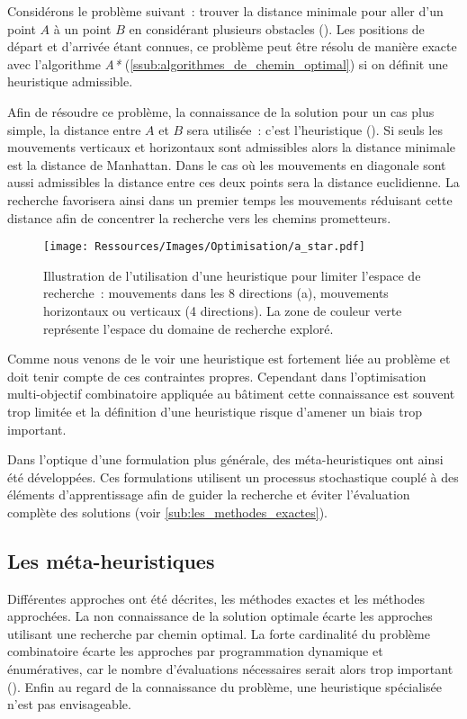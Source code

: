 Considérons le problème suivant~: trouver la distance minimale pour aller d’un point
$A$ à un point $B$ en considérant plusieurs obstacles ().
Les positions de départ et d’arrivée étant connues, ce problème peut être résolu
de manière exacte avec l’algorithme \textit{A*} (\ref{ssub:algorithmes_de_chemin_optimal})
si on définit une heuristique admissible.

Afin de résoudre ce problème, la connaissance de la solution pour un cas plus
simple, la distance entre $A$ et $B$ sera utilisée~: c’est l’heuristique
(). Si seuls les mouvements verticaux et horizontaux sont
admissibles alors la distance minimale est la distance de Manhattan. Dans le cas
où les mouvements en diagonale sont aussi admissibles la distance entre ces deux
points sera la distance euclidienne. La recherche favorisera ainsi dans un
premier temps les mouvements réduisant cette distance afin de concentrer la
recherche vers les chemins prometteurs.

\begin{figure}
    \centering
    \texttt{[image: Ressources/Images/Optimisation/a\_star.pdf]}
    \caption[Illustration de l’utilisation d’une heuristique]
            {Illustration de l’utilisation d’une heuristique pour limiter l’espace
             de recherche~: mouvements dans les 8 directions (a), mouvements
             horizontaux ou verticaux (4 directions). La zone de couleur verte
             représente l’espace du domaine de recherche exploré.}
    \label{fig:a_star}
\end{figure}

Comme nous venons de le voir une heuristique est fortement liée au problème et
doit tenir compte de ces contraintes propres. Cependant dans l’optimisation
multi-objectif combinatoire appliquée au bâtiment cette connaissance est souvent
trop limitée et la définition d’une heuristique risque d’amener un biais trop
important.

Dans l’optique d’une formulation plus générale, des méta-heuristiques ont ainsi
été développées. Ces formulations utilisent un processus stochastique couplé à des
éléments d’apprentissage afin de guider la recherche et éviter l’évaluation
complète des solutions (voir \ref{sub:les_methodes_exactes}).



\subsection{Les méta-heuristiques} %
\label{sub:les_meta_heuristiques}
Différentes approches ont été décrites, les méthodes exactes et les méthodes approchées.
La non connaissance de la solution optimale écarte les approches utilisant une recherche
par chemin optimal. La forte cardinalité du problème combinatoire écarte les approches par
programmation dynamique et énumératives, car le nombre d’évaluations nécessaires serait
alors trop important (). Enfin au regard de la
connaissance du problème, une heuristique spécialisée n’est pas envisageable.

